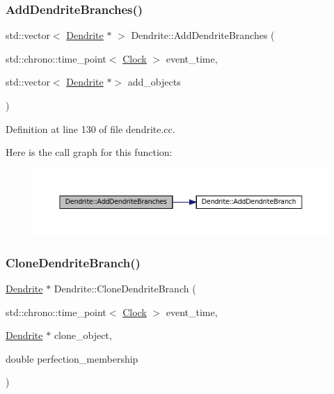 \subsubsection{\texorpdfstring{Add\+Dendrite\+Branches()}{AddDendriteBranches()}}
{\footnotesize\ttfamily std\+::vector$<$ \mbox{\hyperlink{class_dendrite}{Dendrite}} $\ast$ $>$ Dendrite\+::\+Add\+Dendrite\+Branches (\begin{DoxyParamCaption}\item[{std\+::chrono\+::time\+\_\+point$<$ \mbox{\hyperlink{universe_8h_a0ef8d951d1ca5ab3cfaf7ab4c7a6fd80}{Clock}} $>$}]{event\+\_\+time,  }\item[{std\+::vector$<$ \mbox{\hyperlink{class_dendrite}{Dendrite}} $\ast$$>$}]{add\+\_\+objects }\end{DoxyParamCaption})}



Definition at line 130 of file dendrite.\+cc.

Here is the call graph for this function\+:\nopagebreak
\begin{figure}[H]
\begin{center}
\leavevmode
\includegraphics[width=350pt]{class_dendrite_a3e6a80da180b60290545cfc92f221a05_cgraph}
\end{center}
\end{figure}
\mbox{\label{class_dendrite_ab682ffb9bfd1a1da1623e6b641471068}} 
\subsubsection{\texorpdfstring{Clone\+Dendrite\+Branch()}{CloneDendriteBranch()}}
{\footnotesize\ttfamily \mbox{\hyperlink{class_dendrite}{Dendrite}} $\ast$ Dendrite\+::\+Clone\+Dendrite\+Branch (\begin{DoxyParamCaption}\item[{std\+::chrono\+::time\+\_\+point$<$ \mbox{\hyperlink{universe_8h_a0ef8d951d1ca5ab3cfaf7ab4c7a6fd80}{Clock}} $>$}]{event\+\_\+time,  }\item[{\mbox{\hyperlink{class_dendrite}{Dendrite}} $\ast$}]{clone\+\_\+object,  }\item[{double}]{perfection\+\_\+membership }\end{DoxyParamCaption})}



